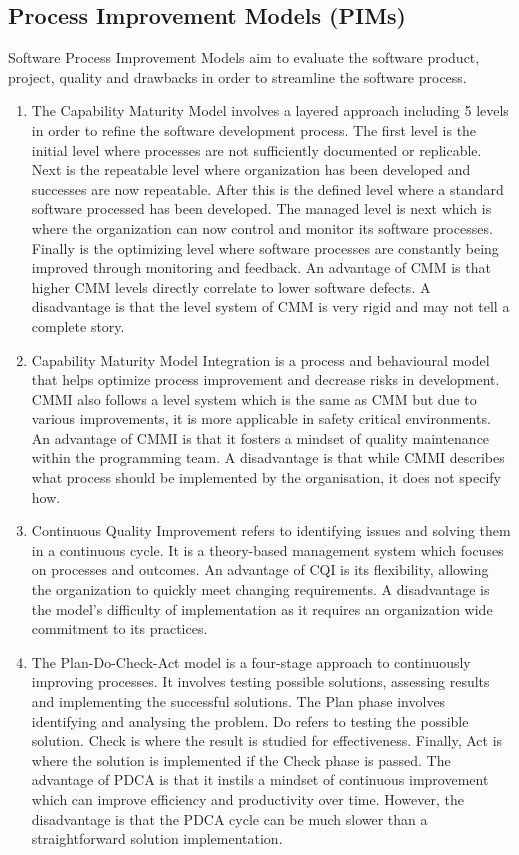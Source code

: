 \documentclass{article}
\begin{document}
   \subsection{Process Improvement Models (PIMs)}
   Software Process Improvement Models aim to evaluate the software product, project, quality and drawbacks in order to streamline the software process.
   \begin{enumerate}
       

    \item The Capability Maturity Model involves a layered approach including 5 levels in order to refine the software development process. The first level is the initial level where processes are not sufficiently documented or replicable. Next is the repeatable level where organization has been developed and successes are now repeatable. After this is the defined level where a standard software processed has been developed. The managed level is next which is where the organization can now control and monitor its software processes. Finally is the optimizing level where software processes are constantly being improved through monitoring and feedback. An advantage of CMM is that higher CMM levels directly correlate to lower software defects. A disadvantage is that the level system of CMM is very rigid and may not tell a complete story.
    
    \item  Capability Maturity Model Integration is a process and behavioural model that helps optimize process improvement and decrease risks in development. CMMI also follows a level system which is the same as CMM but due to various improvements, it is more applicable in safety critical environments. An advantage of CMMI is that it fosters a mindset of quality maintenance within the programming team. A disadvantage is that while CMMI describes what process should be implemented by the organisation, it does not specify how. \cite{capability}
    
    \item Continuous Quality Improvement refers to identifying issues and solving them in a continuous cycle. It is a theory-based management system which focuses on processes and outcomes. An advantage of CQI is its flexibility, allowing the organization to quickly meet changing requirements. A disadvantage is the model’s difficulty of implementation as it requires an organization wide commitment to its practices.
    
    \item The Plan-Do-Check-Act model is a four-stage approach to continuously improving processes. It involves testing possible solutions, assessing results and implementing the successful solutions. The Plan phase involves identifying and analysing the problem. Do refers to testing the possible solution. Check is where the result is studied for effectiveness. Finally, Act is where the solution is implemented if the Check phase is passed. The advantage of PDCA is that it instils a mindset of continuous improvement which can improve efficiency and productivity over time. However, the disadvantage is that the PDCA cycle can be much slower than a straightforward solution implementation.\cite{plandocheckact}
    

\end{enumerate}
\end{document}
